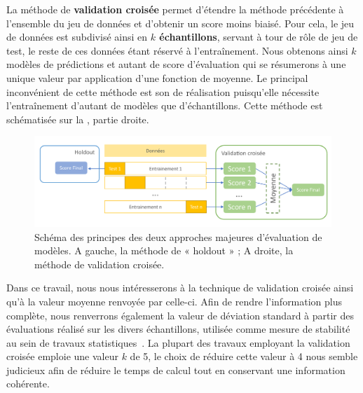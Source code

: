 La méthode de \textbf{validation croisée} permet d'étendre la méthode précédente à l'ensemble du jeu de données et d'obtenir un score moins biaisé. Pour cela, le jeu de données est subdivisé ainsi en \textbf{$k$ échantillons}, servant à tour de rôle de jeu de test, le reste de ces données étant réservé à l'entraînement. Nous obtenons ainsi $k$ modèles de prédictions et autant de score d'évaluation qui se résumerons à une unique valeur par application d'une fonction de moyenne. Le principal inconvénient de cette méthode est son de réalisation puisqu'elle nécessite l'entraînement d'autant de modèles que d'échantillons. Cette méthode est schématisée sur la , partie droite.\par

\begin{figure}[H]
    \centering
    \includegraphics[width=\textwidth]{contents/chapter_3/resources/scheme_holdout_cv.pdf}
    \caption{Schéma des principes des deux approches majeures d'évaluation de modèles. A gauche, la méthode de « holdout » ; A droite, la méthode de validation croisée.}
    \label{fig:scheme_holdout_cv}
\end{figure}

Dans ce travail, nous nous intéresserons à la technique de validation croisée ainsi qu'à la valeur moyenne renvoyée par celle-ci. Afin de rendre l'information plus complète, nous renverrons également la valeur de déviation standard à partir des évaluations réalisé sur les divers échantillons, utilisée comme mesure de stabilité au sein de travaux statistiques~\cite{Kim2009}. La plupart des travaux employant la validation croisée emploie une valeur $k$ de 5, le choix de réduire cette valeur à 4 nous semble judicieux afin de réduire le temps de calcul tout en conservant une information cohérente.\par

